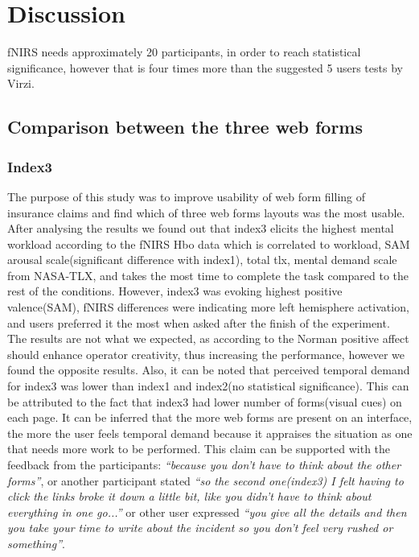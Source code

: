 \documentclass[a4paper]{report}
\begin{document}
\chapter{Discussion}

	fNIRS needs approximately 20 participants, in order to reach statistical significance, however that is four times more than the suggested 5 users tests by Virzi\cite{virzi1992refining}.
	
	
	\section{Comparison between the three web forms}
		\subsection{Index3}
		The purpose of this study was to improve usability of web form filling of insurance claims and find which of three web forms layouts was the most usable. After analysing the results we found out that index3 elicits the highest mental workload according to the fNIRS Hbo data which is correlated to workload, SAM arousal scale(significant difference with index1), total tlx, mental demand scale from NASA-TLX, and takes the most time to complete the task compared to the rest of the conditions. However, index3 was evoking highest positive valence(SAM), fNIRS differences were indicating more left hemisphere activation, and users preferred it the most when asked after the finish of the experiment. The results are not what we expected, as according to the Norman\cite{norman2002emotion} positive affect should enhance operator creativity, thus increasing the performance, however we found the opposite results. Also, it can be noted that perceived temporal demand for index3 was lower than index1 and index2(no statistical significance). This can be attributed to the fact that index3 had lower number of forms(visual cues) on each page. It can be inferred that the more web forms are present on an interface, the more the user feels temporal demand because it appraises the situation as one that needs more work to be performed. This claim can be supported with the feedback from the participants: \textit{``because you don't have to think about the other forms''}, or another participant stated \textit{``so the second one(index3) I felt having to click the links broke it down a little bit, like you didn't have to think about everything in one go...''} or other user expressed \textit{``you give all the details and then you take your time to write about the incident so you don't feel very rushed or something''}. 
\end{document}
